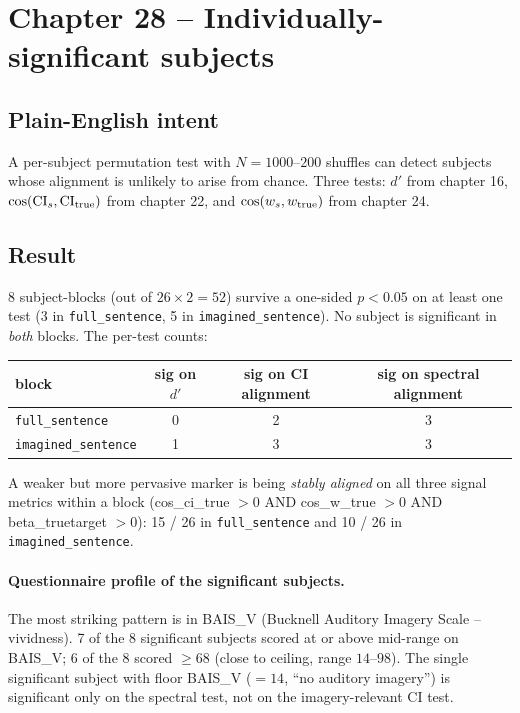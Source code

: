 \documentclass[11pt]{article}
\begin{document}
\clearpage

\section{Chapter 28 -- Individually-significant subjects}

\subsection{Plain-English intent}

A per-subject permutation test with $N=1000$--$200$ shuffles can
detect subjects whose alignment is unlikely to arise from chance.
Three tests:
$d'$ from chapter 16,
$\cos(\mathrm{CI}_s,\mathrm{CI}_{\rm true})$ from chapter 22, and
$\cos(w_s,w_{\rm true})$ from chapter 24.

\subsection{Result}

8 subject-blocks (out of $26\times 2=52$) survive a one-sided
$p<0.05$ on at least one test (3 in \texttt{full\_sentence},
5 in \texttt{imagined\_sentence}). No subject is significant in
\emph{both} blocks. The per-test counts:

\begin{center}
\begin{tabular}{lccc}
\toprule
block & sig on $d'$ & sig on CI alignment & sig on spectral alignment \\
\midrule
\texttt{full\_sentence}     & 0 & 2 & 3 \\
\texttt{imagined\_sentence} & 1 & 3 & 3 \\
\bottomrule
\end{tabular}
\end{center}

A weaker but more pervasive marker is being \emph{stably aligned} on
all three signal metrics within a block (cos\_ci\_true $>0$ AND
cos\_w\_true $>0$ AND beta\_truetarget $>0$): 15 / 26 in
\texttt{full\_sentence} and 10 / 26 in \texttt{imagined\_sentence}.

\paragraph{Questionnaire profile of the significant subjects.}
The most striking pattern is in BAIS\_V (Bucknell Auditory Imagery
Scale -- vividness). 7 of the 8 significant subjects scored at or
above mid-range on BAIS\_V; 6 of the 8 scored $\ge 68$ (close to
ceiling, range $14$--$98$). The single significant subject with floor
BAIS\_V ($=14$, ``no auditory imagery'') is significant only on the
spectral test, not on the imagery-relevant CI test.
\end{document}
